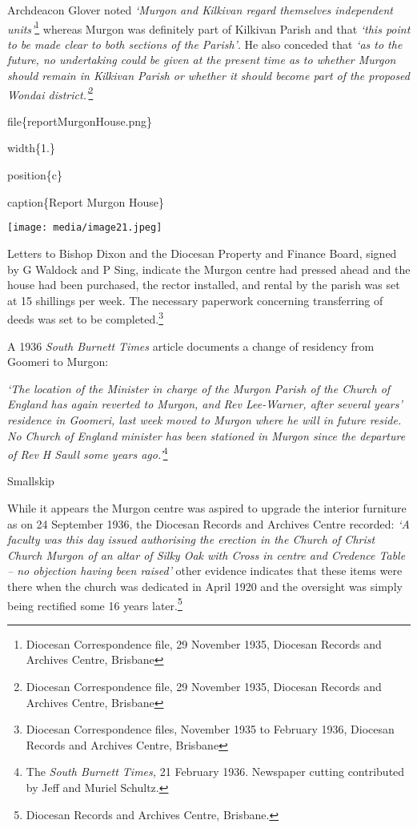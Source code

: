 Archdeacon Glover noted \emph{`Murgon and Kilkivan regard themselves independent units'}\footnote{Diocesan Correspondence file, 29 November 1935, Diocesan Records and Archives Centre, Brisbane} whereas Murgon was definitely part of Kilkivan Parish and that \emph{`this point to be made clear to both sections of the Parish'}. He also conceded that \emph{`as to the future, no undertaking could be given at the present time as to whether Murgon should remain in Kilkivan Parish or whether it should become part of the proposed Wondai district.'}\footnote{Diocesan Correspondence file, 29 November 1935, Diocesan Records and Archives Centre, Brisbane}

file\{reportMurgonHouse.png\}

width\{1.\}

position\{c\}

caption\{Report Murgon House\}

\texttt{[image: media/image21.jpeg]}

Letters to Bishop Dixon and the Diocesan Property and Finance Board, signed by G Waldock and P Sing, indicate the Murgon centre had pressed ahead and the house had been purchased, the rector installed, and rental by the parish was set at 15 shillings per week. The necessary paperwork concerning transferring of deeds was set to be completed.\footnote{Diocesan Correspondence files, November 1935 to February 1936, Diocesan Records and Archives Centre, Brisbane}

A 1936 \emph{South Burnett Times} article documents a change of residency from Goomeri to Murgon:

\emph{`The location of the Minister in charge of the Murgon Parish of the Church of England has again reverted to Murgon, and Rev Lee-Warner, after several years' residence in Goomeri, last week moved to Murgon where he will in future reside. No Church of England minister has been stationed in Murgon since the departure of Rev H Saull some years ago.'}\footnote{The \emph{South Burnett Times,} 21 February 1936. Newspaper cutting contributed by Jeff and Muriel Schultz.}

Smallskip

While it appears the Murgon centre was aspired to upgrade the interior furniture as on 24 September 1936, the Diocesan Records and Archives Centre recorded: \emph{`A faculty was this day issued authorising the erection in the Church of Christ Church Murgon of an altar of Silky Oak with Cross in centre and Credence Table -- no objection having been raised'} other evidence indicates that these items were there when the church was dedicated in April 1920 and the oversight was simply being rectified some 16 years later.\footnote{Diocesan Records and Archives Centre, Brisbane.}

